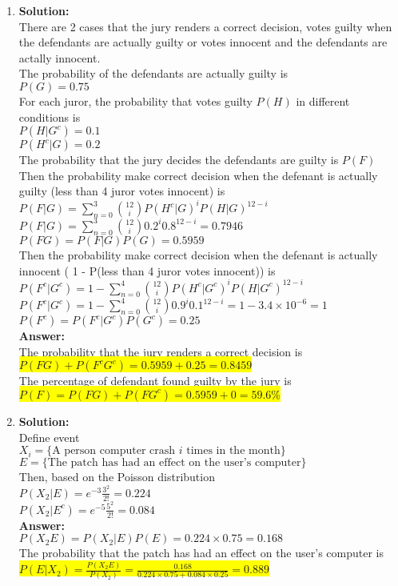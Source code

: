 \documentclass{article}
\newcommand{\myansw}{\textbf{Answer:}\\}
\newcommand{\mysolu}{\textbf{Solution:}\\}
\begin{document}
\begin{enumerate}
\begin{enumerate}
	\end{enumerate}
	\item
	\mysolu
	There are 2 cases that the jury renders a correct decision, votes guilty when the defendants are actually guilty or votes innocent and the defendants are actally innocent.\\
	The probability of the defendants are actually guilty is\\
	${P(G) = 0.75}$\\
	For each juror, the probability that votes guilty ${P(H)}$ in different conditions is\\
	${P(H|G^c) = 0.1}$\\
	${P(H^c|G) = 0.2}$\\
	The probability that the jury decides the defendants are guilty is ${P(F)}$\\ 
	Then the probability make correct decision when the defenant is actually guilty (less than 4 juror votes innocent) is\\
	${P(F|G) = \sum\limits_{n = 0}^3 {12 \choose i} P(H^c|G)^i P(H|G)^{12-i}}$\\
	${P(F|G) = \sum\limits_{n = 0}^3 {12 \choose i} 0.2^i 0.8^{12-i}= 0.7946}$\\
	${P(FG) = P(F|G)P(G) = 0.5959}$\\
	Then the probability make correct decision when the defenant is actually innocent ( 1 - P(less than 4 juror votes innocent)) is\\
	${P(F^c|G^c) = 1 - \sum\limits_{n = 0}^4 {12 \choose i} P(H^c|G^c)^i P(H|G^c)^{12-i}}$\\
	${P(F^c|G^c) =1 -  \sum\limits_{n = 0}^4 {12 \choose i} 0.9^i 0.1^{12-i}= 1 - 3.4 \times 10^{-6}=1}$\\
	${P(F^c) = P(F^c|G^c)P(G^c) = 0.25}$\\
	\myansw
	The probability that the jury renders a correct decision is\\
	\colorbox{yellow}{${P(FG)+P(F^cG^c) = 0.5959 + 0.25 = 0.8459}$}\\
	The percentage of defendant found guilty by the jury is\\
	\colorbox{yellow}{${P(F) = P(FG)+P(FG^c) = 0.5959 + 0 = 59.6\%}$}\\
	
	\item
	\mysolu
	Define event\\
	${X_i = \{\text{A person computer crash }i\text{ times in the month}\}}$\\
	${E = \{\text{The patch has had an effect on the user's computer}\}}$\\
	Then, based on the Poisson distribution\\
	${P(X_2|E) = e^{-3}\frac{3^2}{2!}=0.224}$\\
	${P(X_2|E^c) = e^{-5}\frac{5^2}{2!}=0.084}$\\
	\myansw
	${P(X_2E) = P(X_2|E)P(E) = 0.224 \times 0.75 = 0.168}$\\
	The probability that the patch has had an effect on the user's computer is\\
	\colorbox{yellow}{${P(E|X_2) = \frac{P(X_2E)}{P(X_2)}=\frac{0.168}{0.224\times 0.75+0.084 \times 0.25}=0.889}$}\\	
	

\end{enumerate}
\end{document}
